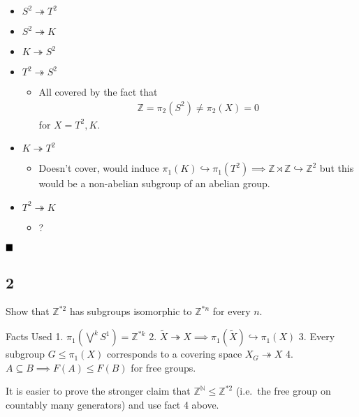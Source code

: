 \begin{itemize}
\tightlist
\item
  \(S^2 \twoheadrightarrow T^2\)
\item
  \(S^2 \twoheadrightarrow K\)
\item
  \(K \twoheadrightarrow S^2\)
\item
  \(T^2 \twoheadrightarrow S^2\)

  \begin{itemize}
  \tightlist
  \item
    All covered by the fact that
    \begin{align*}
      {\mathbb{Z}}= \pi_2(S^2) \neq \pi_2(X) = 0
      \end{align*}
    for \(X = T^2, K\).
  \end{itemize}
\item
  \(K \twoheadrightarrow T^2\)

  \begin{itemize}
  \tightlist
  \item
    Doesn't cover, would induce
    \(\pi_1(K) \hookrightarrow\pi_1(T^2) \implies {\mathbb{Z}}\rtimes{\mathbb{Z}}\hookrightarrow{\mathbb{Z}}^2\)
    but this would be a non-abelian subgroup of an abelian group.
  \end{itemize}
\item
  \(T^2 \twoheadrightarrow K\)

  \begin{itemize}
  \tightlist
  \item
    ?
  \end{itemize}
\end{itemize}

\(\hfill\blacksquare\)

\hypertarget{section-6}{%
\subsection{2}\label{section-6}}

Show that \({\mathbb{Z}}^{\ast 2}\) has subgroups isomorphic to
\({\mathbb{Z}}^{\ast n}\) for every \(n\).

Facts Used 1. \(\pi_1(\bigvee^k S^1) = {\mathbb{Z}}^{\ast k}\) 2.
\(\tilde X \twoheadrightarrow X \implies \pi_1(\tilde X) \hookrightarrow\pi_1(X)\)
3. Every subgroup \(G \leq \pi_1(X)\) corresponds to a covering space
\(X_G \twoheadrightarrow X\) 4.
\(A \subseteq B \implies F(A) \leq F(B)\) for free groups.

It is easier to prove the stronger claim that
\({\mathbb{Z}}^{\mathbb{N}}\leq {\mathbb{Z}}^{\ast 2}\) (i.e.~the free
group on countably many generators) and use fact 4 above.

